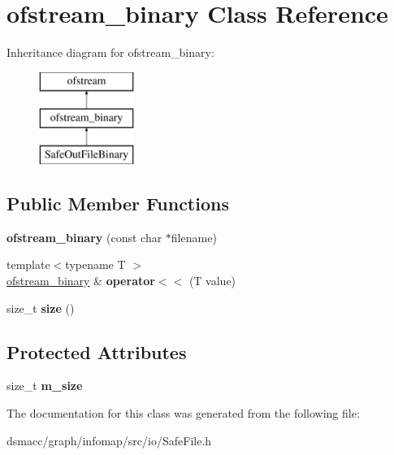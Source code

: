 \hypertarget{classofstream__binary}{}\section{ofstream\+\_\+binary Class Reference}
\label{classofstream__binary}
Inheritance diagram for ofstream\+\_\+binary\+:\begin{figure}[H]
\begin{center}
\leavevmode
\includegraphics[height=3.000000cm]{classofstream__binary}
\end{center}
\end{figure}
\subsection*{Public Member Functions}
\begin{DoxyCompactItemize}
\item 
\mbox{\label{classofstream__binary_a4112e3eb2b870623428a45c6de69ae13}} 
{\bfseries ofstream\+\_\+binary} (const char $\ast$filename)
\item 
\mbox{\label{classofstream__binary_a5c510d647262d49a233e8cf4aa0301c5}} 
{\footnotesize template$<$typename T $>$ }\\\mbox{\hyperlink{classofstream__binary}{ofstream\+\_\+binary}} \& {\bfseries operator$<$$<$} (T value)
\item 
\mbox{\label{classofstream__binary_aa20410348ec173c2eed77ef1873a9f42}} 
size\+\_\+t {\bfseries size} ()
\end{DoxyCompactItemize}
\subsection*{Protected Attributes}
\begin{DoxyCompactItemize}
\item 
\mbox{\label{classofstream__binary_a5d9eaafa06afb0967e372fcf1b708527}} 
size\+\_\+t {\bfseries m\+\_\+size}
\end{DoxyCompactItemize}


The documentation for this class was generated from the following file\+:\begin{DoxyCompactItemize}
\item 
dsmacc/graph/infomap/src/io/Safe\+File.\+h\end{DoxyCompactItemize}
